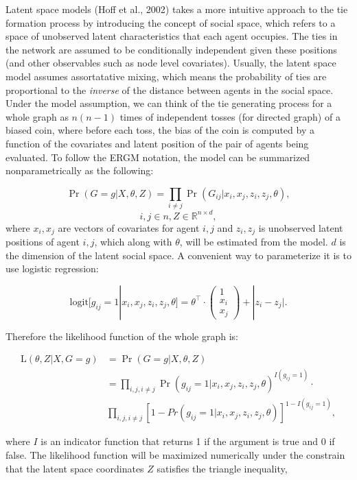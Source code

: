 \documentclass[11pt]{article}
\begin{document}
Latent space models (Hoff et al., 2002) takes a more intuitive approach to the tie formation process by introducing the concept of social space, which refers to a space of unobserved latent characteristics that each agent occupies. The ties in the network are assumed to be conditionally independent given these positions (and other observables such as node level covariates). Usually, the latent space model assumes assortatative mixing, which means the probability of ties are proportional to the \emph{inverse} of the distance between agents in the social space. \\

Under the model assumption, we can think of the tie generating process for a whole graph as $n(n-1)$ times of independent tosses (for directed graph) of a biased coin, where before each toss, the bias of the coin is computed by a function of the covariates and latent position of the pair of agents being evaluated. To follow the ERGM notation, the model can be summarized nonparametrically as the following:

$$\Pr(G=g|X,\theta,Z) = \prod_{i \not= j} \Pr(G_{ij}|x_i,x_j,z_i,z_j,\theta),$$
$$i, j \in n,Z \in \mathbb{R}^{n\times d},$$
where $x_i, x_j$ are vectors of covariates for agent $i,j$ and $z_i, z_j$ is unobserved latent positions of agent $i,j$, which along with $\theta$, will be estimated from the model. $d$ is the dimension of the latent social space. A convenient way to parameterize it is to use logistic regression:

$$\text{logit}[g_{ij}=1|x_i,x_j,z_i,z_j,\theta]=\theta^\intercal \cdot \begin{pmatrix}
1\\x_i\\x_j \end{pmatrix} + |z_i - z_j|.$$ 

Therefore the likelihood function of the whole graph is:

\begin{align*}
\text{L}(\theta,Z|X,G=g)&=\Pr(G=g|X,\theta,Z) \\
&= \prod_{i,j,i\not=j}\Pr(g_{ij}=1|x_i,x_j,z_i,z_j,\theta)^{I(g_{ij}=1)} \cdot\\ 
&\prod_{i,j,i\not=j}[1-Pr(g_{ij}=1|x_i,x_j,z_i,z_j,\theta)]^{1-I(g_{ij}=1)},
\end{align*}


where $I$ is an indicator function that returns 1 if the argument is true and 0 if false. The likelihood function will be maximized numerically under the constrain that the latent space coordinates $Z$ satisfies the triangle inequality, 
\end{document}
